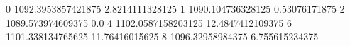 0 1092.3953857421875 2.8214111328125
1 1090.104736328125 0.53076171875
2 1089.573974609375 0.0
4 1102.0587158203125 12.4847412109375
6 1101.338134765625 11.76416015625
8 1096.32958984375 6.755615234375
